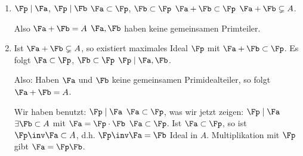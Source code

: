 \begin{Beweis}
\begin{enumerate}
\item  $\Fp\mid\Fa$, $\Fp\mid\Fb$ \folge $\Fa\subset\Fp$, $\Fb\subset \Fp$ \folge $\Fa+\Fb\subset\Fp$ \folge $\Fa+\Fb\subsetneq A$.
 
 Also $\Fa+\Fb=A$ \folge $\Fa,\Fb$ haben keine gemeinsamen Primteiler.
 \item Ist $\Fa+\Fb\subsetneq A$, so existiert maximales Ideal $\Fp$ mit $\Fa+\Fb\subset\Fp$. Es folgt $\Fa\subset\Fp$, $\Fb\subset\Fp$ \folge $\Fp\mid\Fa,\Fb$. 
 
 Also: Haben $\Fa$ und $\Fb$ keine gemeinsamen Primidealteiler, so folgt $\Fa+\Fb=A$.
 
 Wir haben benutzt: $\Fp\mid \Fa$ \gdw $\Fa\subset \Fp$, was wir jetzt zeigen: $\Fp \mid \Fa$ \folge $\exists \Fb\subset A$ mit $\Fa=\Fp\cdot \Fb$ \folge $\Fa\subset \Fp$. Ist $\Fa\subset\Fp$, so ist $\Fp\inv\Fa\subset A$, d.h. $\Fp\inv\Fa=\Fb$ Ideal in $A$.  Multiplikation mit $\Fp$ gibt $\Fa=\Fp\Fb$.
\end{enumerate}
\end{Beweis}